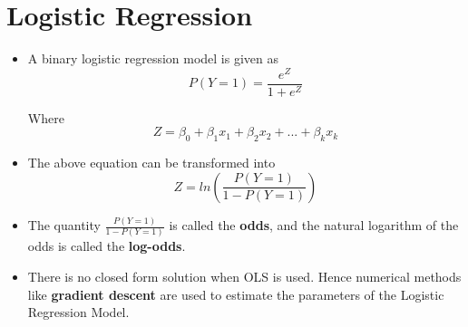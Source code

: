 \documentclass{article}
\theoremstyle{plain}
\theoremstyle{definition}
\begin{document}
\section{Logistic Regression}
\begin{itemize}
    \item A binary logistic regression model is given as
    \begin{equation*}
        P(Y=1) = \frac{e^Z}{1+e^Z}
    \end{equation*}
    
    Where
    \begin{equation*}
        Z = \beta_0  + \beta_1 x_1 + \beta_2 x_2 + ... + \beta_k x_k
    \end{equation*}
    
    \item The above equation can be transformed into
    \begin{equation}
        Z = ln \left( \frac{P(Y=1)}{1-P(Y=1)} \right)
    \end{equation}
    
    \item The quantity $\frac{P(Y=1)}{1-P(Y=1)}$ is called the \textbf{odds}, and the natural logarithm of the odds is called the \textbf{log-odds}. 
    
    \item There is no closed form solution when OLS is used. Hence numerical methods like \textbf{gradient descent} are used to estimate the parameters of the Logistic Regression Model. 
\end{itemize}
\end{document}

